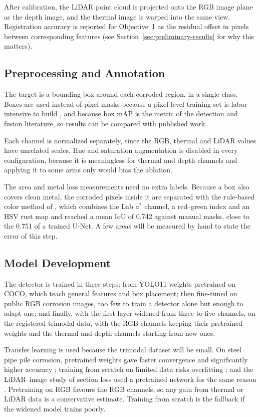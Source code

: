After calibration, the LiDAR point cloud is projected onto the RGB image plane as
the depth image, and the thermal image is warped into the same view. Registration
accuracy is reported for Objective~1 as the residual offset in pixels between
corresponding features (see Section~\ref{sec:preliminary-results} for why this
matters).

\subsection{Preprocessing and Annotation}
\label{sec:annotation}

The target is a bounding box around each corroded region, in a single class.
Boxes are used instead of pixel masks because a pixel-level training set is
labor-intensive to build \citep{Lim2021}, and because box mAP is the metric of the
detection and fusion literature, so results can be compared with published work.

Each channel is normalized separately, since the RGB, thermal and LiDAR values
have unrelated scales. Hue and saturation augmentation is disabled in every
configuration, because it is meaningless for thermal and depth channels and
applying it to some arms only would bias the ablation.

The area and metal loss measurements need no extra labels. Because a box also
covers clean metal, the corroded pixels inside it are separated with the
rule-based color method of \citet{Alvani2026}, which combines the Lab $a^*$
channel, a red--green index and an HSV rust map and reached a mean IoU of 0.742
against manual masks, close to the 0.751 of a trained U-Net. A few areas will be
measured by hand to state the error of this step.

\subsection{Model Development}
\label{sec:model}

The detector is trained in three steps: from YOLO11 weights pretrained on COCO,
which teach general features and box placement; then fine-tuned on public RGB
corrosion images, too few to train a detector alone but enough to adapt one; and
finally, with the first layer widened from three to five channels, on the
registered trimodal data, with the RGB channels keeping their pretrained weights
and the thermal and depth channels starting from new ones.

Transfer learning is used because the trimodal dataset will be small. On steel
pipe pile corrosion, pretrained weights gave faster convergence and significantly
higher accuracy \citep{Han2024}; training from scratch on limited data risks
overfitting \citep{Rashidi2026}; and the LiDAR--image study of section loss used a
pretrained network for the same reason \citep{Maru2025}. Pretraining on RGB favours
the RGB channels, so any gain from thermal or LiDAR data is a conservative
estimate. Training from scratch is the fallback if the widened model trains
poorly.

